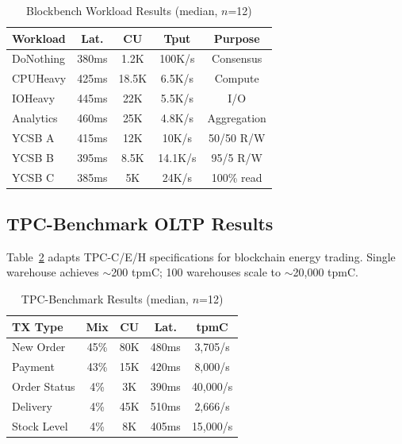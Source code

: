 \documentclass[conference]{IEEEtran}
\begin{document}
\begin{table}[htbp]
\caption{Blockbench Workload Results (median, $n$=12)}
\begin{center}
\small
\begin{tabular}{@{}lcccc@{}}
\toprule
\textbf{Workload} & \textbf{Lat.} & \textbf{CU} & \textbf{Tput} & \textbf{Purpose} \\
\midrule
DoNothing & 380ms & 1.2K & 100K/s & Consensus \\
CPUHeavy & 425ms & 18.5K & 6.5K/s & Compute \\
IOHeavy & 445ms & 22K & 5.5K/s & I/O \\
Analytics & 460ms & 25K & 4.8K/s & Aggregation \\
\midrule
YCSB A & 415ms & 12K & 10K/s & 50/50 R/W \\
YCSB B & 395ms & 8.5K & 14.1K/s & 95/5 R/W \\
YCSB C & 385ms & 5K & 24K/s & 100\% read \\
\bottomrule
\end{tabular}
\label{tab:blockbench}
\end{center}
\end{table}

\subsection{TPC-Benchmark OLTP Results}

Table~\ref{tab:tpc} adapts TPC-C/E/H specifications \cite{tpc} for blockchain energy trading. Single warehouse achieves $\sim$200 tpmC; 100 warehouses scale to $\sim$20,000 tpmC.

\begin{table}[htbp]
\caption{TPC-Benchmark Results (median, $n$=12)}
\begin{center}
\small
\begin{tabular}{@{}lcccc@{}}
\toprule
\textbf{TX Type} & \textbf{Mix} & \textbf{CU} & \textbf{Lat.} & \textbf{tpmC} \\
\midrule
New Order & 45\% & 80K & 480ms & 3,705/s \\
Payment & 43\% & 15K & 420ms & 8,000/s \\
Order Status & 4\% & 3K & 390ms & 40,000/s \\
Delivery & 4\% & 45K & 510ms & 2,666/s \\
Stock Level & 4\% & 8K & 405ms & 15,000/s \\
\bottomrule
\end{tabular}
\label{tab:tpc}
\end{center}
\end{table}
\end{document}
